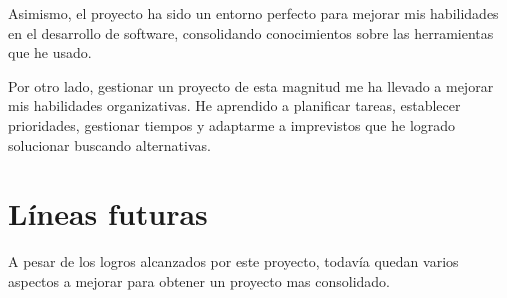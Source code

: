 Asimismo, el proyecto ha sido un entorno perfecto para mejorar mis habilidades en el desarrollo de software, consolidando conocimientos sobre las herramientas que he usado.

Por otro lado, gestionar un proyecto de esta magnitud me ha llevado a mejorar mis habilidades organizativas. He aprendido a planificar tareas, establecer prioridades, gestionar tiempos y adaptarme a imprevistos que he logrado solucionar buscando alternativas.

\section{Líneas futuras}
\label{sec:LineasFuturas}
A pesar de los logros alcanzados por este proyecto, todavía quedan varios aspectos a mejorar para obtener un proyecto mas consolidado.

